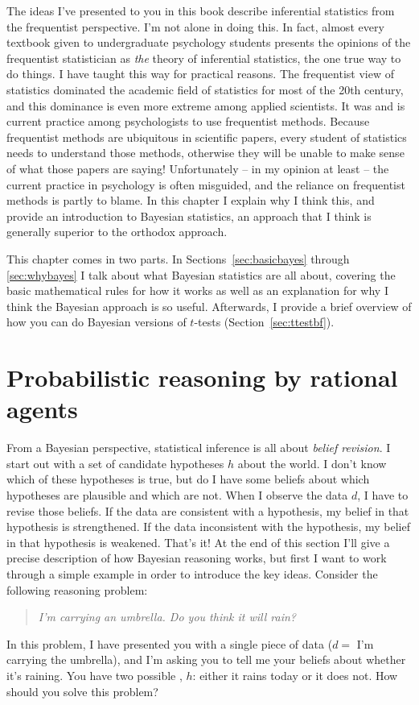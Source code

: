 \bigskip

The ideas I've presented to you in this book describe inferential statistics from the frequentist perspective. I'm not alone in doing this. In fact, almost every textbook given to undergraduate psychology students presents the opinions of the frequentist statistician as {\it the} theory of inferential statistics, the one true way to do things. I have taught this way for practical reasons. The frequentist view of statistics dominated the academic field of statistics for most of the 20th century, and this dominance is even more extreme among applied scientists. It was and is current practice among psychologists to use frequentist methods. Because frequentist methods are ubiquitous in scientific papers, every student of statistics needs to understand those methods, otherwise they will be unable to make sense of what those papers are saying! Unfortunately -- in my opinion at least -- the current practice in psychology is often misguided, and the reliance on frequentist methods is partly to blame. In this chapter I explain why I think this, and provide an introduction to Bayesian statistics, an approach that I think is generally superior to the orthodox approach.

This chapter comes in two parts. In Sections~\ref{sec:basicbayes} through \ref{sec:whybayes} I talk about what Bayesian statistics are all about, covering the basic mathematical rules for how it works as well as an explanation for why I think the Bayesian approach is so useful. Afterwards, I provide a brief overview of how you can do Bayesian versions of $t$-tests (Section~\ref{sec:ttestbf}).


\section{Probabilistic reasoning by rational agents\label{sec:basicbayes}}



From a Bayesian perspective, statistical inference is all about {\it belief revision}. I start out with a set of candidate hypotheses $h$ about the world. I don't know which of these hypotheses is true, but do I have some beliefs about which hypotheses are plausible and which are not. When I observe the data $d$, I have to revise those beliefs. If the data are consistent with a hypothesis, my belief in that hypothesis is strengthened. If the data inconsistent with the hypothesis, my belief in that hypothesis is weakened. That's it! At the end of this section I'll give a precise description of how Bayesian reasoning works, but first I want to work through a simple example in order to introduce the key ideas. Consider the following reasoning problem:
\begin{quote}
{\it I'm carrying an umbrella. Do you think it will rain?}
\end{quote}
In this problem, I have presented you with a single piece of data ($d =$ I'm carrying the umbrella), and I'm asking you to tell me your beliefs about whether it's raining. You have two possible , $h$: either it rains today or it does not. How should you solve this problem? 

